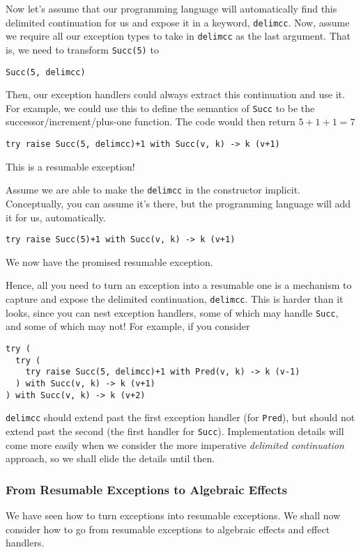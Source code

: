 Now let's assume that our programming language will automatically find this delimited continuation for us and expose it in a keyword, \texttt{delimcc}. Now, assume we require all our exception types to take in \texttt{delimcc} as the last argument. That is, we need to transform \texttt{Succ(5)} to
\begin{verbatim}
Succ(5, delimcc) 
\end{verbatim}
Then, our exception handlers could always extract this continuation and use it. For example, we could use this to define the semantics of \texttt{Succ} to be the successor/increment/plus-one function. The code would then return $5+1+1=7$
\begin{verbatim}
try raise Succ(5, delimcc)+1 with Succ(v, k) -> k (v+1)
\end{verbatim}
This is a resumable exception!

Assume we are able to make the \texttt{delimcc} in the constructor implicit. Conceptually, you can assume it's there, but the programming language will add it for us, automatically. 
\begin{verbatim}
try raise Succ(5)+1 with Succ(v, k) -> k (v+1)
\end{verbatim}
We now have the promised resumable exception. 

Hence, all you need to turn an exception into a resumable one is a mechanism to capture and expose the delimited continuation, \texttt{delimcc}. This is harder than it looks, since you can nest exception handlers, some of which may handle \texttt{Succ}, and some of which may not! For example, if you consider
\begin{verbatim}
try (
  try (
    try raise Succ(5, delimcc)+1 with Pred(v, k) -> k (v-1)
  ) with Succ(v, k) -> k (v+1) 
) with Succ(v, k) -> k (v+2)
\end{verbatim}
\texttt{delimcc} should extend past the first exception handler (for \texttt{Pred}), but should not extend past the second (the first handler for \texttt{Succ}). Implementation details will come more easily when we consider the more imperative \textit{delimited continuation} approach, so we shall elide the details until then.

\subsubsection{From Resumable Exceptions to Algebraic Effects}
We have seen how to turn exceptions into resumable exceptions. We shall now consider how to go from resumable exceptions to algebraic effects and effect handlers. 

